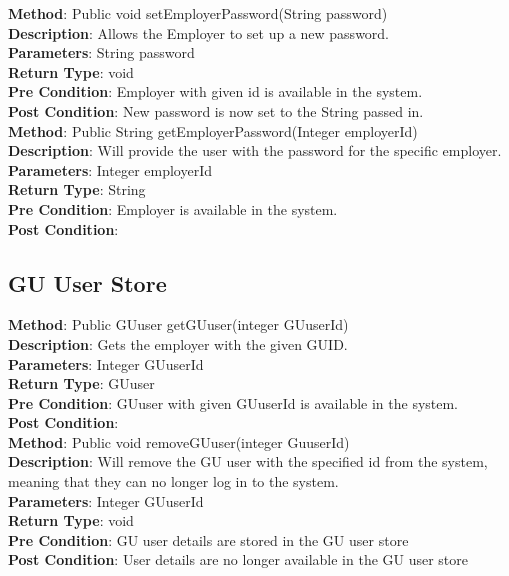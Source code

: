 \documentclass{l3deliverable}
\begin{document}
\textbf{Method}: Public void setEmployerPassword(String password) \\
\textbf{Description}: Allows the Employer to set up a new password.\\
\textbf{Parameters}: String password\\
\textbf{Return Type}: void\\
\textbf{Pre Condition}: Employer with given id is available in the system.\\
\textbf{Post Condition}: New password is now set to the String passed in.\\

\textbf{Method}: Public String getEmployerPassword(Integer employerId) \\
\textbf{Description}: Will provide the user with the password for the specific employer.\\
\textbf{Parameters}: Integer employerId\\
\textbf{Return Type}: String \\
\textbf{Pre Condition}: Employer is available in the system.\\
\textbf{Post Condition}:\\

\subsection{GU User Store}

\textbf{Method}: Public GUuser getGUuser(integer GUuserId)\\
\textbf{Description}: Gets the employer with the given GUID.\\
\textbf{Parameters}: Integer GUuserId\\
\textbf{Return Type}: GUuser\\
\textbf{Pre Condition}: GUuser with given GUuserId is available in the system.\\
\textbf{Post Condition}:\\

\textbf{Method}: Public void removeGUuser(integer GuuserId)\\
\textbf{Description}: Will remove the GU user with the specified id from the system, meaning that they can no longer log in to the system.
\\
\textbf{Parameters}: Integer GUuserId\\
\textbf{Return Type}: void\\
\textbf{Pre Condition}: GU user details are stored in the GU user store\\
\textbf{Post Condition}: User details are no longer available in the GU user store\\
\end{document}
